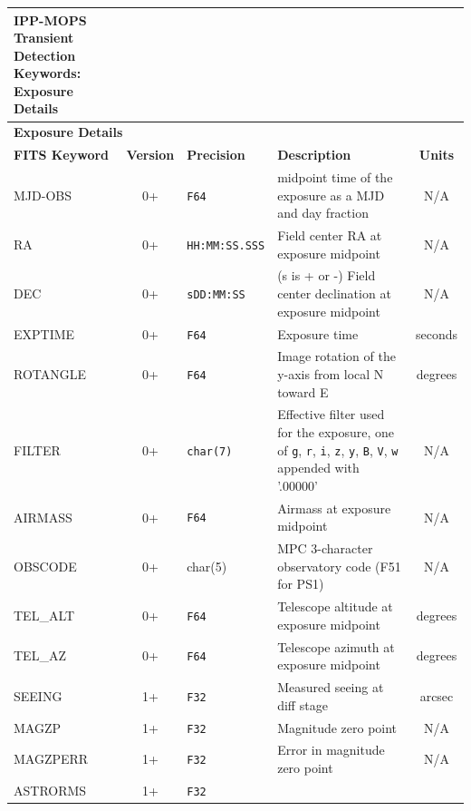 \documentclass[panstarrs,spec]{panstarrs}
\begin{document}
\begin{center}
  \begin{longtable}{|lcp{0.5in}p{3in}c|}
    \caption{IPP-MOPS Transient Detection Keywords:\\ Exposure Details}\label{table-keywords-exposure}\\
    \hline \hline
    \multicolumn{5}{|l|}{\null\hspace{10mm}\textbf{Exposure Details}}\\
    \hline \hline {\bf FITS Keyword}
    & \parbox{0.5in}{\textbf{Version}} & {\bf Precision} & {\bf
      Description}
    & \textbf{Units}\\
    \hline MJD-OBS & 0+ & \texttt{F64} & midpoint time of the exposure
    as a MJD and day fraction
    & N/A\\
    \hline RA & 0+ & {\tiny \texttt{HH:MM:SS.SSS}}
    & Field center RA at exposure midpoint & N/A \\
    \hline DEC & 0+ & {\tiny \texttt{sDD:MM:SS}} &
    (s is + or -) Field center declination at exposure midpoint & N/A \\
    \hline EXPTIME & 0+ & \texttt{F64}
    & Exposure time & seconds \\
    \hline ROTANGLE & 0+ & \texttt{F64}
    & Image rotation of the y-axis from local N toward E & degrees \\
    \hline FILTER & 0+ & \texttt{char(7)} & Effective filter used for
    the exposure, one of \texttt{g}, \texttt{r}, \texttt{i},
    \texttt{z}, \texttt{y}, \texttt{B},
    \texttt{V}, \texttt{w} appended with '.00000' & N/A \\
    \hline AIRMASS & 0+ & \texttt{F64}
    & Airmass at exposure midpoint & N/A\\
    \hline OBSCODE & 0+ & char(5) &
    MPC 3-character observatory code (F51 for PS1) & N/A \\
    \hline TEL\_ALT & 0+ & \texttt{F64} &
    Telescope altitude at exposure midpoint & degrees \\
    \hline TEL\_AZ & 0+ & \texttt{F64}
    & Telescope azimuth at exposure midpoint & degrees \\
    \hline SEEING & 1+ & \texttt{F32} &
    Measured seeing at diff stage & arcsec \\
    \hline MAGZP & 1+ & \texttt{F32} &
    Magnitude zero point & N/A \\
    \hline MAGZPERR & 1+ & \texttt{F32} &
    Error in magnitude zero point & N/A \\
    \hline ASTRORMS & 1+ & \texttt{F32} &

\end{longtable}
\end{center}
\end{document}
